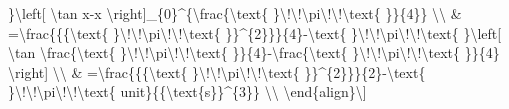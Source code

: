 \}\textbackslash left{[} \textbackslash tan x-x \textbackslash right{]}\_\{0\}\textasciicircum\{\textbackslash frac\{\textbackslash text\{
\}\textbackslash !\textbackslash !\textbackslash pi\textbackslash !\textbackslash !\textbackslash text\{
\}\}\{4\}\} \textbackslash\textbackslash{} \& =\textbackslash frac\{\{\{\textbackslash text\{
\}\textbackslash !\textbackslash !\textbackslash pi\textbackslash !\textbackslash !\textbackslash text\{
\}\}\textasciicircum\{2\}\}\}\{4\}-\textbackslash text\{ \}\textbackslash !\textbackslash !\textbackslash pi\textbackslash !\textbackslash !\textbackslash text\{
\}\textbackslash left{[} \textbackslash tan \textbackslash frac\{\textbackslash text\{
\}\textbackslash !\textbackslash !\textbackslash pi\textbackslash !\textbackslash !\textbackslash text\{
\}\}\{4\}-\textbackslash frac\{\textbackslash text\{ \}\textbackslash !\textbackslash !\textbackslash pi\textbackslash !\textbackslash !\textbackslash text\{
\}\}\{4\} \textbackslash right{]} \textbackslash\textbackslash{}
\& =\textbackslash frac\{\{\{\textbackslash text\{ \}\textbackslash !\textbackslash !\textbackslash pi\textbackslash !\textbackslash !\textbackslash text\{
\}\}\textasciicircum\{2\}\}\}\{2\}-\textbackslash text\{ \}\textbackslash !\textbackslash !\textbackslash pi\textbackslash !\textbackslash !\textbackslash text\{
unit\}\{\{\textbackslash text\{s\}\}\textasciicircum\{3\}\} \textbackslash\textbackslash{}
\textbackslash end\{align\}\textbackslash{]}